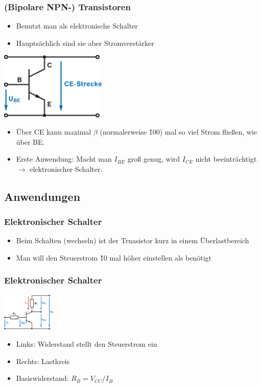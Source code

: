 \documentclass[ngerman,compress]{beamer}
\begin{document}
\begin{frame}
	\frametitle{(Bipolare NPN-) Transistoren}
	\begin{itemize}
		\item Benutzt man als elektronische Schalter
		\item Hauptsächlich sind sie aber Stromverstärker
	\end{itemize}
	\includegraphics[width=2in]{transistor.png}
	\begin{itemize}
		\item Über CE kann maximal $\beta$ (normalerweise \~ 100) mal so viel
			Strom fließen, wie über BE.
		\item Erste Anwendung: Macht man $I_{BE}$ groß genug, wird $I_{CE}$
			nicht beeinträchtigt $\rightarrow$ elektronischer Schalter.
	\end{itemize}
\end{frame}

\subsection{Anwendungen}

\begin{frame}
	\frametitle{Elektronischer Schalter}
	\begin{itemize}
		\item Beim Schalten (wechseln) ist der Trnasistor kurz in einem
			Überlastbereich
		\item Man will den Steuerstrom \~ 10 mal höher einstellen als benötigt
	\end{itemize}
\end{frame}

\begin{frame}
	\frametitle{Elektronischer Schalter}
	\includegraphics[width=1in]{schalter.png}
	\begin{itemize}
		\item Links: Widerstand stellt den Steuerstrom ein
		\item Rechts: Lastkreis
		\item Basiswiderstand: $R_B = V_{CC} / I_B$
	\end{itemize}
\end{frame}
\end{document}
